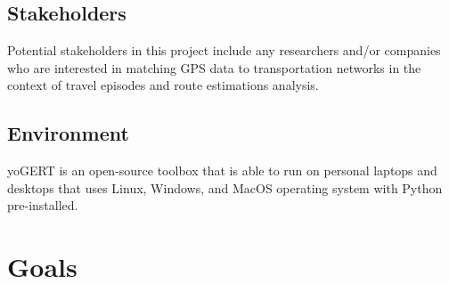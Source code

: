 \documentclass{article}
\begin{document}
\subsection{Stakeholders}
Potential stakeholders in this project include any researchers and/or companies who are interested in matching GPS data to transportation networks in the context of travel episodes and route estimations analysis. 

\subsection{Environment}
yoGERT is an open-source toolbox that is able to run on personal laptops and desktops that uses Linux, Windows, and MacOS operating system 
with Python pre-installed.

\newpage
\section{Goals}
\end{document}
